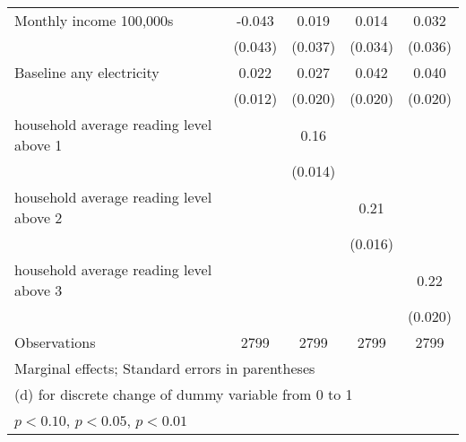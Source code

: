 \begin{table}[htbp]
\begin{tabular*}{1\hsize}{@{\hskip\tabcolsep\extracolsep\fill}l*{4}{c}}
Monthly income 100,000s&   -0.043         &    0.019         &    0.014         &    0.032         \\
                &  (0.043)         &  (0.037)         &  (0.034)         &  (0.036)         \\
Baseline any electricity&    0.022\sym{*}  &    0.027         &    0.042\sym{**} &    0.040\sym{*}  \\
                &  (0.012)         &  (0.020)         &  (0.020)         &  (0.020)         \\
household average reading level above 1&                  &     0.16\sym{***}&                  &                  \\
                &                  &  (0.014)         &                  &                  \\
household average reading level above 2&                  &                  &     0.21\sym{***}&                  \\
                &                  &                  &  (0.016)         &                  \\
household average reading level above 3&                  &                  &                  &     0.22\sym{***}\\
                &                  &                  &                  &  (0.020)         \\
\midrule
Observations    &     2799         &     2799         &     2799         &     2799         \\
\bottomrule
\multicolumn{5}{l}{\footnotesize Marginal effects; Standard errors in parentheses}\\
\multicolumn{5}{l}{\footnotesize  (d) for discrete change of dummy variable from 0 to 1}\\
\multicolumn{5}{l}{\footnotesize \sym{*} \(p<0.10\), \sym{**} \(p<0.05\), \sym{***} \(p<0.01\)}\\
\end{tabular*}
\end{table}
